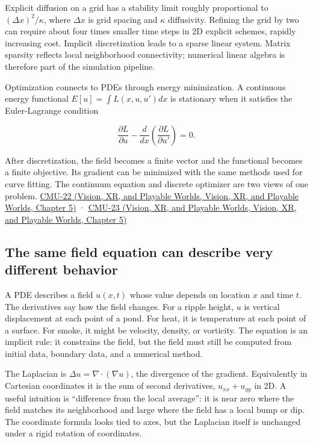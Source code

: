Explicit diffusion on a grid has a stability limit roughly proportional to \((\Delta x)^2/\kappa\), where \(\Delta x\) is grid spacing and \(\kappa\) diffusivity. Refining the grid by two can require about four times smaller time steps in 2D explicit schemes, rapidly increasing cost. Implicit discretization leads to a sparse linear system. Matrix sparsity reflects local neighborhood connectivity; numerical linear algebra is therefore part of the simulation pipeline.

Optimization connects to PDEs through energy minimization. A continuous energy functional \(E[u]=\int L(x,u,u')dx\) is stationary when it satisfies the Euler-Lagrange condition

\[
\frac{\partial L}{\partial u}-\frac{d}{dx}\left(\frac{\partial L}{\partial u'}\right)=0.
\]

After discretization, the field becomes a finite vector and the functional becomes a finite objective. Its gradient can be minimized with the same methods used for curve fitting. The continuum equation and discrete optimizer are two views of one problem. \href{../07-Vision-XR-and-Playable-Worlds/main.pdf\#nameddest=04-visual-computing-ii-ch036-cmu-22---optimization}{CMU-22 (Vision, XR, and Playable Worlds, Vision, XR, and Playable Worlds, Chapter 5)} · \href{../07-Vision-XR-and-Playable-Worlds/main.pdf\#nameddest=04-visual-computing-ii-ch036-cmu-23---physically-based-animation-and-pdes}{CMU-23 (Vision, XR, and Playable Worlds, Vision, XR, and Playable Worlds, Chapter 5)}

\subsection{The same field equation can describe very different behavior}\label{04-visual-computing-ii-ch030-the-same-field-equation-can-describe-very-different-behavior}

A PDE describes a field \(u(x,t)\) whose value depends on location \(x\) and time \(t\). The derivatives say how the field changes. For a ripple height, \(u\) is vertical displacement at each point of a pond. For heat, it is temperature at each point of a surface. For smoke, it might be velocity, density, or vorticity. The equation is an implicit rule: it constrains the field, but the field must still be computed from initial data, boundary data, and a numerical method.

The Laplacian is \(\Delta u=\nabla\cdot(\nabla u)\), the divergence of the gradient. Equivalently in Cartesian coordinates it is the sum of second derivatives, \(u_{xx}+u_{yy}\) in 2D. A useful intuition is ``difference from the local average'': it is near zero where the field matches its neighborhood and large where the field has a local bump or dip. The coordinate formula looks tied to axes, but the Laplacian itself is unchanged under a rigid rotation of coordinates.

